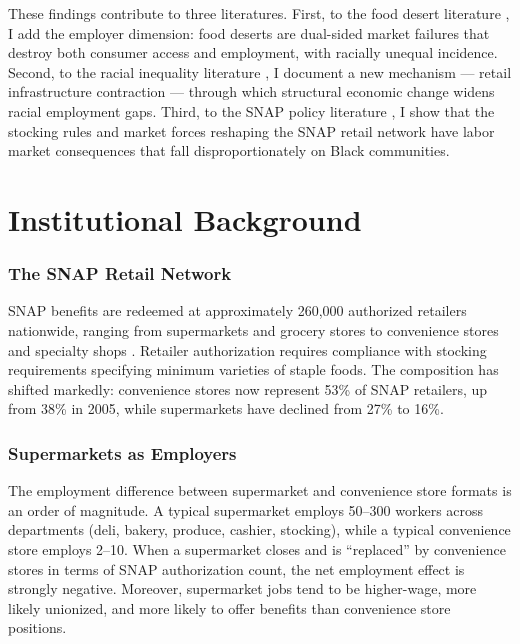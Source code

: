 \documentclass[12pt]{article}
\begin{document}
These findings contribute to three literatures. First, to the food desert literature \citep{allcott2019food, handbury2015goods, cuffey2022snap}, I add the employer dimension: food deserts are dual-sided market failures that destroy both consumer access and employment, with racially unequal incidence. Second, to the racial inequality literature \citep{derenoncourt2022minimum, hardy2017losing}, I document a new mechanism --- retail infrastructure contraction --- through which structural economic change widens racial employment gaps. Third, to the SNAP policy literature \citep{hoynes2016long, bitler2020transfers}, I show that the stocking rules and market forces reshaping the SNAP retail network have labor market consequences that fall disproportionately on Black communities.

\section{Institutional Background}

\subsubsection*{The SNAP Retail Network} SNAP benefits are redeemed at approximately 260,000 authorized retailers nationwide, ranging from supermarkets and grocery stores to convenience stores and specialty shops \citep{usda2023snap}. Retailer authorization requires compliance with stocking requirements specifying minimum varieties of staple foods. The composition has shifted markedly: convenience stores now represent 53\% of SNAP retailers, up from 38\% in 2005, while supermarkets have declined from 27\% to 16\%.

\subsubsection*{Supermarkets as Employers} The employment difference between supermarket and convenience store formats is an order of magnitude. A typical supermarket employs 50--300 workers across departments (deli, bakery, produce, cashier, stocking), while a typical convenience store employs 2--10. When a supermarket closes and is ``replaced'' by convenience stores in terms of SNAP authorization count, the net employment effect is strongly negative. Moreover, supermarket jobs tend to be higher-wage, more likely unionized, and more likely to offer benefits than convenience store positions.
\end{document}
